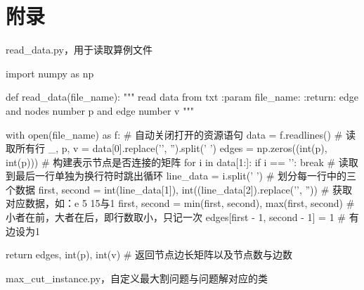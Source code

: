 \documentclass{article}
\begin{document}
    \section{附录}
    \noindent
    read\_data.py，用于读取算例文件
    \begin{python}
    import numpy as np

    def read_data(file_name):
        """
        read data from txt
        :param file_name:
        :return: edge and nodes number p and edge number v
        """

        with open(file_name) as f:  # 自动关闭打开的资源语句
            data = f.readlines()  # 读取所有行
        _, p, v = data[0].replace('\n', '').split(' ')
        edges = np.zeros((int(p), int(p)))  # 构建表示节点是否连接的矩阵
        for i in data[1:]:
            if i == '\n':
                break  # 读取到最后一行单独为换行符时跳出循环
            line_data = i.split(' ')  # 划分每一行中的三个数据
            first, second = int(line_data[1]), int((line_data[2]).replace('\n', ''))  # 获取对应数据，如：e 5 15与1
            first, second = min(first, second), max(first, second)  # 小者在前，大者在后，即行数取小，只记一次
            edges[first - 1, second - 1] = 1  # 有边设为1

        return edges, int(p), int(v)  # 返回节点边长矩阵以及节点数与边数
    \end{python}
    max\_cut\_instance.py，自定义最大割问题与问题解对应的类
\end{document}
